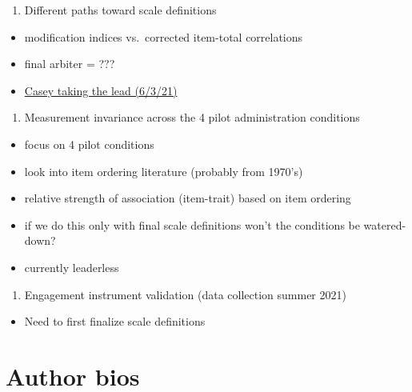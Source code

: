 \documentclass[
]{book}
\providecommand{\tightlist}{%
  \setlength{\itemsep}{0pt}\setlength{\parskip}{0pt}}
\begin{document}
\begin{enumerate}
\def\labelenumi{\arabic{enumi}.}
\setcounter{enumi}{1}
\tightlist
\item
  Different paths toward scale definitions\\
\end{enumerate}

\begin{itemize}
\tightlist
\item
  modification indices vs.~corrected item-total correlations
\item
  final arbiter = ???
\item
  \href{https://github.com/casosorio/SIOP-Engagement-Measurment-Invariance}{Casey taking the lead (6/3/21)}
\end{itemize}

\begin{enumerate}
\def\labelenumi{\arabic{enumi}.}
\setcounter{enumi}{2}
\tightlist
\item
  Measurement invariance across the 4 pilot administration conditions
\end{enumerate}

\begin{itemize}
\tightlist
\item
  focus on 4 pilot conditions
\item
  look into item ordering literature (probably from 1970's)
\item
  relative strength of association (item-trait) based on item ordering
\item
  if we do this only with final scale definitions won't the conditions be watered-down?
\item
  currently leaderless
\end{itemize}

\begin{enumerate}
\def\labelenumi{\arabic{enumi}.}
\setcounter{enumi}{3}
\tightlist
\item
  Engagement instrument validation (data collection summer 2021)
\end{enumerate}

\begin{itemize}
\tightlist
\item
  Need to first finalize scale definitions
\end{itemize}

\hypertarget{author-bios}{%
\chapter{Author bios}\label{author-bios}}
\end{document}
